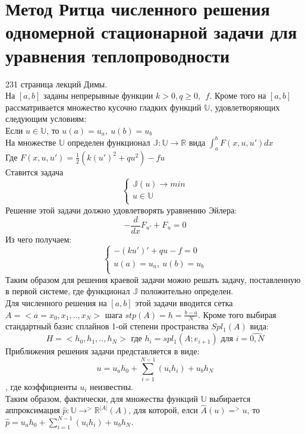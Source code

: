 \documentclass[__main__.tex]{subfiles}
\begin{document}
\section{Метод Ритца численного решения одномерной стационарной задачи для уравнения теплопроводности}

231 страница лекций Димы.\\

На $[a,b]$ заданы непрерывные функции $k>0,q\ge 0,\ \ f$. Кроме того на $[a,b]$ рассматривается множество кусочно гладких функций $\mathbb{U}$, удовлетворяющих следующим условиям:\\
Если $u\in \mathbb{U}$, то $u(a)=u_a,\ u(b)=u_b$\\
На множестве $\mathbb{U}$ определен функционал $\mathbb{J}:\mathbb{U}\rightarrow\mathbb{R}$ вида $\int_a^bF(x,u,u')dx$\\
Где $F(x,u,u')=\frac{1}{2}(k(u')^2+qu^2)-fu$\\
Ставится задача 
\begin{equation}
\begin{cases}
\mathbb{J}(u)\rightarrow min\\
u\in \mathbb{U}\\
\end{cases}
\end{equation}
Решение этой задачи должно удовлетворять уравнению Эйлера:
$$-\frac{d}{dx}F_{u'}+F_u=0$$
Из чего получаем:
\begin{equation}
\begin{cases}
-(ku')'+qu-f=0\\
u(a)=u_a,\ u(b)=u_b\\
\end{cases}
\end{equation}
Таким образом для решения краевой задачи можно решать задачу, поставленную в первой системе, где функционал $\mathbb{J}$ положительно определен.\\

Для численного решения на $[a,b]$ этой задачи вводится сетка $A=<a=x_0,x_1,..,x_N>$ шага $stp(A)=h=\frac{b-a}{N}$. Кроме того выбирая стандартный базис сплайнов 1-ой степени пространства $Spl_1(A)$ вида:
$$H=<h_0,h_1,..,h_N>\text{ где } h_i=spl_1(A;e_{i+1}) \text{ для } i = \hat{0,N}$$
Приближения решения задачи представляется в виде:
$$ u =u_a h_0+\sum_{i=1}^{N-1}(u_i h_i)+u_b h_N $$
, где коэффициенты $u_i$ неизвестны.\\
Таким образом, фактически, для множества функций $\mathbb{U}$ выбирается аппроксимация $\hat{p}:\mathbb{U}\rightarrow^>\mathbb{R}^{|A|}(A)$, для которой, елси $\hat{A}(u)=^>u$, то $\hat{p}=u_a h_0+\sum_{i=1}^{N-1}(u_i h_i)+u_b h_N$.\\
\end{document}
